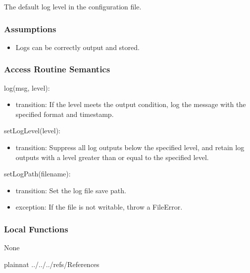 \documentclass[12pt, titlepage]{article}
\begin{document}
The default log level in the configuration file.

\subsubsection{Assumptions}

\begin{itemize}
\item Logs can be correctly output and stored.
\end{itemize}

\subsubsection{Access Routine Semantics}

\noindent log(msg, level):
\begin{itemize}
\item transition: If the level meets the output condition, log the message with
the specified format and timestamp.
\end{itemize}

\noindent setLogLevel(level):
\begin{itemize}
\item transition: Suppress all log outputs below the specified level, and retain
log outputs with a level greater than or equal to the specified level.
\end{itemize}

\noindent setLogPath(filename):
\begin{itemize}
\item transition: Set the log file save path.
\item exception: If the file is not writable, throw a FileError.
\end{itemize}

\subsubsection{Local Functions}

None

\newpage

 {plainnat}
 {../../../refs/References}



\end{document}
